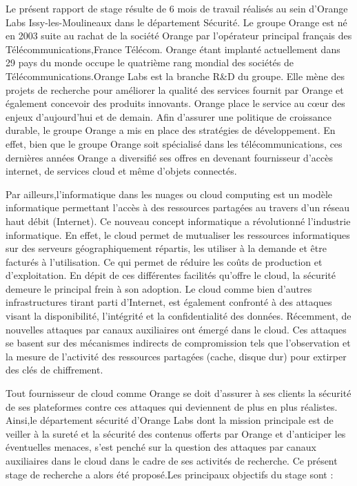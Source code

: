 Le présent rapport de stage résulte de 6 mois de travail réalisés au sein d'Orange Labs Issy-les-Moulineaux dans le département  Sécurité. Le groupe Orange est né en 2003 suite au  rachat de la société Orange par l'opérateur principal français des Télécommunications,France Télécom. Orange étant implanté actuellement dans 29 pays du monde occupe le quatrième rang mondial des sociétés de Télécommunications.Orange Labs est la branche R&D du groupe. Elle mène des projets de recherche pour améliorer la qualité des services fournit par Orange et également concevoir des produits innovants. Orange place le service au cœur des enjeux d'aujourd'hui et de demain.
Afin  d'assurer une politique de croissance durable, le groupe Orange a mis en place des stratégies de développement. En effet, bien que le groupe Orange soit spécialisé dans les télécommunications, ces dernières années Orange a diversifié ses offres en devenant fournisseur d'accès internet, de services cloud et même d'objets connectés. 
\par 
Par ailleurs,l'informatique dans les nuages ou cloud computing est un modèle  informatique permettant  l'accès à des ressources partagées au travers d'un réseau haut débit (Internet). Ce nouveau concept informatique a révolutionné l'industrie informatique.  En effet, le cloud permet de  mutualiser les ressources informatiques sur des serveurs géographiquement répartis, les utiliser à la demande et être facturés à l'utilisation. Ce qui permet de réduire les coûts de production et d'exploitation. En dépit de ces différentes facilités qu'offre le  cloud, la sécurité demeure  le principal  frein  à son  adoption.  Le cloud comme bien d'autres infrastructures tirant parti d'Internet, est également confronté à des attaques visant la disponibilité, l'intégrité et la confidentialité des données. Récemment, de nouvelles attaques  par  canaux auxiliaires  ont émergé dans le cloud. Ces attaques se basent sur des mécanismes indirects de compromission  tels que l'observation  et la mesure de l'activité des ressources partagées (cache, disque dur)  pour extirper des clés de chiffrement. 
\par 
Tout fournisseur de cloud comme Orange se doit d'assurer à ses clients la sécurité de ses plateformes contre ces attaques qui deviennent de plus en plus réalistes.
Ainsi,le département sécurité d'Orange Labs dont la mission  principale est  de veiller à la sureté et la sécurité des contenus offerts par Orange et d'anticiper les éventuelles menaces, s'est penché sur la question des attaques par canaux auxiliaires dans le cloud dans le cadre de ses activités de recherche. Ce présent stage de recherche a alors été proposé.Les principaux objectifs du stage sont :

